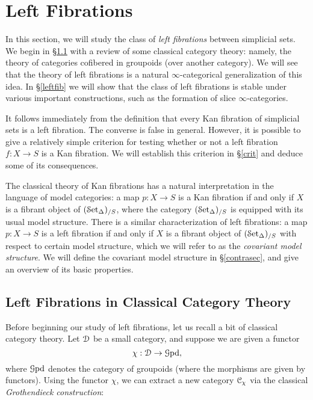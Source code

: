 \section{Left Fibrations}\label{leftfibsec}
 
\setcounter{theorem}{0}
 
 
In this section, we will study the class of {\em left fibrations} between simplicial sets. We begin
in \S \ref{scgp} with a review of some classical category theory: namely, the theory of categories cofibered in groupoids (over another category). We will see that the theory of left fibrations is a natural $\infty$-categorical generalization of this idea. 
In \S \ref{leftfib} we will show that the class of left fibrations is stable under various important constructions, such as the formation of slice $\infty$-categories.

It follows immediately from the definition that every Kan fibration of simplicial sets is a left fibration. The converse is false in general. However, it is possible to give a relatively simple criterion for
testing whether or not a left fibration $f: X \rightarrow S$ is a Kan fibration. We will establish this criterion in \S \ref{crit} and deduce some of its consequences.

The classical theory of Kan fibrations has a natural interpretation in the language of model categories: a map $p: X \rightarrow S$ is a Kan fibration if and only if $X$ is a fibrant object
of $(\operatorname{\mathcal{S}et_{\Delta}})_{/S}$, where the category $(\operatorname{\mathcal{S}et_{\Delta}})_{/S}$ is equipped with its usual model structure. There is a similar characterization of left fibrations: a map $p: X \rightarrow S$ is a left fibration if and only if $X$ is a fibrant object of $(\operatorname{\mathcal{S}et_{\Delta}})_{/S}$ with respect to certain model structure, which
we will refer to as the {\it covariant model structure}. We will define the covariant model structure in \S \ref{contrasec}, and give an overview of its basic properties. 

\subsection{Left Fibrations in Classical Category Theory}\label{scgp}

Before beginning our study of left fibrations, let us recall a bit of classical
category theory. Let $\operatorname{\mathcal{D}}$ be a small category, and suppose we are given a functor $$ \chi: \operatorname{\mathcal{D}} \rightarrow \operatorname{{\mathcal G}pd},$$
where $\operatorname{{\mathcal G}pd}$ denotes the category of groupoids (where the morphisms are
given by functors). Using the functor $\chi$, we can extract a new category
$\operatorname{\mathcal{C}}_{\chi}$ via the classical {\it Grothendieck construction}: 

